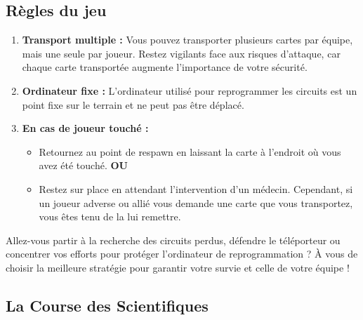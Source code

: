 \documentclass{template}
\begin{document}
\subsection*{Règles du jeu}

\begin{enumerate}
    \item \textbf{Transport multiple :} Vous pouvez transporter plusieurs cartes par équipe, mais une seule par joueur. Restez vigilants face aux risques d’attaque, car chaque carte transportée augmente l’importance de votre sécurité.
    \item \textbf{Ordinateur fixe :} L’ordinateur utilisé pour reprogrammer les circuits est un point fixe sur le terrain et ne peut pas être déplacé.
    \item \textbf{En cas de joueur touché :}
    \begin{itemize}
        \item Retournez au point de respawn en laissant la carte à l’endroit où vous avez été touché.\newline
        \textbf{OU}
        \item Restez sur place en attendant l’intervention d’un médecin. Cependant, si un joueur adverse ou allié vous demande une carte que vous transportez, vous êtes tenu de la lui remettre.
    \end{itemize}
\end{enumerate}

Allez-vous partir à la recherche des circuits perdus, défendre le téléporteur ou concentrer vos efforts pour protéger l’ordinateur de reprogrammation ? À vous de choisir la meilleure stratégie pour garantir votre survie et celle de votre équipe !

\subsection{La Course des Scientifiques}  %
\end{document}
